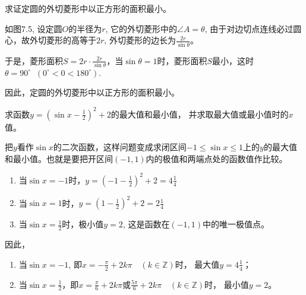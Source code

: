 \begin{example}
    求证定圆的外切菱形中以正方形的面积最小。
\end{example}

\begin{solution}
如图7.5, 设定圆$O$的半径为$r$, 它的外切菱形中的$\angle A=\theta$, 由于对边切点连线必过圆心，故外切菱形的高等于$2r$, 外切菱形的边长为$\frac{2r}{\sin\theta}$。

\begin{figure}[htp]
    \centering
    \caption{}
\end{figure}

    于是，菱形面积$S=2r\cdot \frac{2r}{\sin\theta}$，当$\sin\theta=1$时，菱形面积$S$最小，这时$\theta=90^{\circ}\;\;(0^{\circ}<0<180^{\circ})$.
    
因此，定圆的外切菱形中以正方形的面积最小。
\end{solution}

\begin{example}
求函数$y=\left(\sin x-\frac{1}{2}\right)^2+2$的最大值和最小值，
并求取最大值或最小值时的$x$值。
\end{example}

\begin{solution}
    把$y$看作$\sin x$的二次函数，这样问题变成求闭区间$-1\le \sin x\le 1$上的$y$的最大值和最小值。也就是要把开区间$(-1, 1)$内的极值和两端点处的函数值作比较。

\begin{enumerate}
    \item 当$\sin x=-1$时，$y=\left(-1-\frac{1}{2}\right)^2+2=4\frac{1}{4}$
    \item 当$\sin x=1$时，$y=\left(1-\frac{1}{2}\right)^2+2=2\frac{1}{4}$
    \item 当$\sin x=\frac{1}{2}$时，极小值$y=2$, 这是函数在$(-1, 1)$中的唯一极值点。
\end{enumerate}

因此，
\begin{enumerate}
    \item 当$\sin x=-1$, 即$x=-\frac{\pi}{2}+2k\pi\quad (k\in\mathbb{Z})$时，
最大值$y=4\frac{1}{4}$；
\item 当$\sin x=\frac{1}{2}$，即$x=\frac{\pi}{6}+2k\pi$或$\frac{5\pi}{6}+2k\pi \quad (k\in\mathbb{Z})$时，
最小值$y=2$。
\end{enumerate}


\end{solution}



